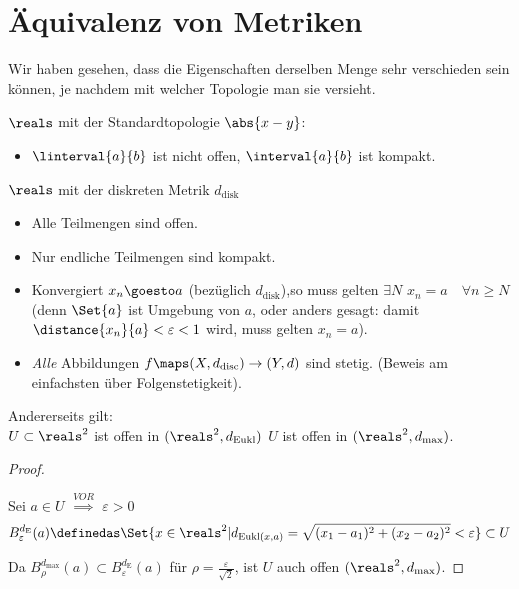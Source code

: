 \section{Äquivalenz von Metriken}
Wir haben gesehen, dass die Eigenschaften derselben Menge sehr verschieden sein können, je nachdem mit welcher Topologie man sie versieht.
\begin{beispiel*}
    \( \reals \) mit der Standardtopologie \( \abs{x-y} \):
    \begin{itemize}
        \item \( \linterval{a}{b} \) ist nicht offen, \( \interval{a}{b} \) ist kompakt.
    \end{itemize}
    \( \reals \) mit der diskreten Metrik \( d_{\text{disk}} \)
    \begin{itemize}
        \item Alle Teilmengen sind offen.
        \item Nur endliche Teilmengen sind kompakt.
        \item Konvergiert \( x_n\goesto a \) (bezüglich \( d_{\text{disk}} \)),so muss gelten \( \exists N \) \sd \( x_n=a\quad \forall n\geq N \) (denn \( \Set{a} \) ist Umgebung von \( a \), oder anders gesagt: damit \( \distance{x_n}{a}<\varepsilon<1 \) wird, muss gelten \( x_n=a \)).
        \item \emph{Alle} Abbildungen \( f\maps (X,d_{\text{disc}})\to (Y,d) \) sind stetig. (Beweis am einfachsten über Folgenstetigkeit).
    \end{itemize}
    Andererseits gilt:\\
    \( U\subset \reals^2 \) ist offen in \( (\reals^2,d_{\text{Eukl}}) \) \tiff \( U \) ist offen in \( (\reals^2, d_{\max}) \).
    \begin{proof}
        \begin{proofdescription}
            \item[\hin] Sei \( a\in U \) \( \overset{VOR}{\implies} \) \texists \( \varepsilon>0 \) \sd
            \begin{align*}
                B_{\varepsilon}^{d_\text{E}}(a)\definedas \Set{x\in \reals^2|d_{\text{Eukl}(x,a)}=\sqrt{(x_1-a_1)^2+(x_2-a_2)^2}<\varepsilon}\subset U
            \end{align*} 
        \end{proofdescription}
        Da \( B_{\rho}^{d_{\max}}(a)\subset B_{\varepsilon}^{d_{\text{E}}}(a) \) für \( \rho=\frac{\varepsilon}{\sqrt{2}} \), ist \( U \) auch offen \( (\reals^2, d_{\max}) \).

\end{proof}
\end{beispiel*}
